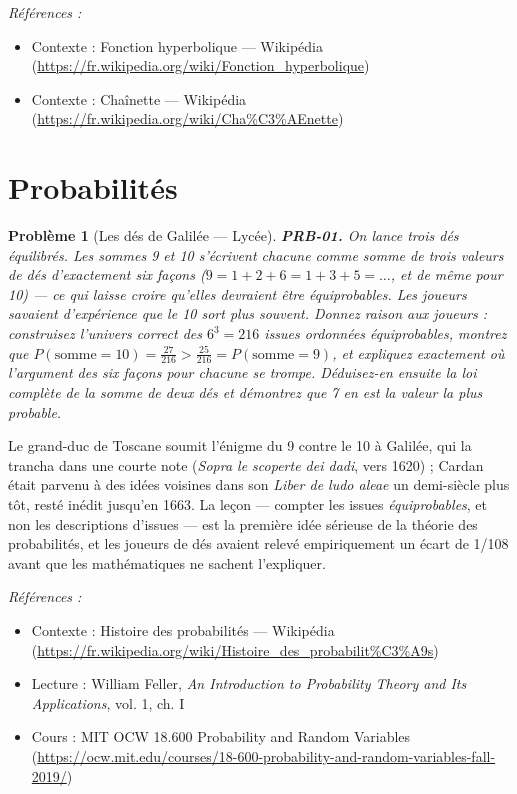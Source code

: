 \documentclass[11pt]{article}
\newtheorem{problem}{Problème}
\newenvironment{refs}{\par\small\noindent\emph{Références :}\begin{itemize}\setlength\itemsep{0pt}}{\end{itemize}\normalsize}
\begin{document}
\begin{refs}
\item Contexte : Fonction hyperbolique --- Wikipédia (\url{https://fr.wikipedia.org/wiki/Fonction_hyperbolique})
\item Contexte : Chaînette --- Wikipédia (\url{https://fr.wikipedia.org/wiki/Cha%C3%AEnette})
\end{refs}

\bigskip


\section*{Probabilités}

\begin{problem}[{Les dés de Galilée --- Lycée}]
\textbf{PRB-01.} On lance trois dés équilibrés. Les sommes 9 et 10 s'écrivent
chacune comme somme de trois valeurs de dés d'exactement six façons
($ 9 = 1{+}2{+}6 = 1{+}3{+}5 = \dots $, et de même pour 10) --- ce qui laisse croire qu'elles
devraient être équiprobables. Les joueurs savaient d'expérience que le 10 sort plus souvent.
Donnez raison aux joueurs : construisez l'univers correct des $ 6^3 = 216 $ issues ordonnées
équiprobables, montrez que
$ P(\text{somme}=10) = \frac{27}{216} > \frac{25}{216} = P(\text{somme}=9) $, et expliquez
exactement où l'argument des \og{} six façons pour chacune \fg{} se trompe. Déduisez-en ensuite la loi
complète de la somme de \textit{deux} dés et démontrez que 7 en est la valeur la plus probable.
\end{problem}

\noindent Le grand-duc de Toscane soumit l'énigme du 9 contre le 10 à Galilée, qui la
trancha dans une courte note (\textit{Sopra le scoperte dei dadi}, vers 1620) ; Cardan était
parvenu à des idées voisines dans son \textit{Liber de ludo aleae} un demi-siècle plus tôt, resté
inédit jusqu'en 1663. La leçon --- compter les issues \textit{équiprobables}, et non les descriptions
d'issues --- est la première idée sérieuse de la théorie des probabilités, et les joueurs de dés
avaient relevé empiriquement un écart de 1/108 avant que les mathématiques ne sachent
l'expliquer.

\begin{refs}
\item Contexte : Histoire des probabilités --- Wikipédia (\url{https://fr.wikipedia.org/wiki/Histoire_des_probabilit%C3%A9s})
\item Lecture : William Feller, \textit{An Introduction to Probability Theory and Its Applications}, vol. 1, ch. I
\item Cours : MIT OCW 18.600 Probability and Random Variables (\url{https://ocw.mit.edu/courses/18-600-probability-and-random-variables-fall-2019/})
\end{refs}
\end{document}

